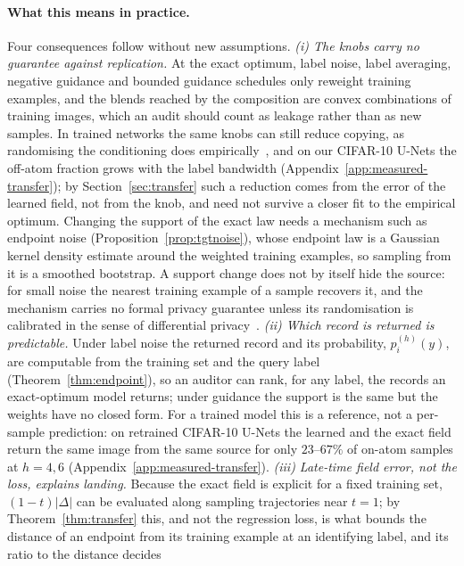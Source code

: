 \documentclass{article} %
\theoremstyle{plain}
\theoremstyle{definition}
\theoremstyle{remark}
\begin{document}
\paragraph{What this means in practice.} Four consequences follow without new assumptions.
\emph{(i) The knobs carry no guarantee against replication.} At the exact optimum, label noise,
label averaging, negative guidance and bounded guidance schedules only reweight training
examples, and the blends reached by the composition are convex combinations of training images,
which an audit should count as leakage rather than as new samples. In trained networks the same
knobs can still reduce copying, as randomising the conditioning does
empirically~\citep{somepalli2023copying}, and on our CIFAR-10 U-Nets the off-atom fraction grows
with the label bandwidth (Appendix~\ref{app:measured-transfer}); by Section~\ref{sec:transfer}
such a reduction comes from the error of the learned field, not from the knob, and need not
survive a closer fit to the empirical optimum. Changing the support of the exact law needs a
mechanism such as endpoint noise (Proposition~\ref{prop:tgtnoise}), whose endpoint law is a
Gaussian kernel density estimate around the weighted training examples, so sampling from it is a
smoothed bootstrap. A support change does not by itself hide the source: for small noise the
nearest training example of a sample recovers it, and the mechanism carries no formal privacy
guarantee unless its randomisation is calibrated in the sense of differential
privacy~\citep{dwork2014algorithmic}.
\emph{(ii) Which record is returned is predictable.} Under label noise the returned record and
its probability, $p_i^{(h)}(y)$, are computable from the training set and the query label
(Theorem~\ref{thm:endpoint}), so an auditor can rank, for any label, the records an exact-optimum
model returns; under guidance the support is the same but the weights have no closed form. For a
trained model this is a reference, not a per-sample prediction: on retrained CIFAR-10 U-Nets the
learned and the exact field return the same image from the same source for only $23$--$67\%$ of
on-atom samples at $h=4,6$ (Appendix~\ref{app:measured-transfer}).
\emph{(iii) Late-time field error, not the loss, explains landing.} Because the exact field is explicit for
a fixed training set, $(1-t)|\Delta|$ can be evaluated along sampling trajectories near $t=1$;
by Theorem~\ref{thm:transfer} this, and not the regression loss, is what bounds the distance of an
endpoint from its training example at an identifying label, and its ratio to the distance decides
\end{document}
